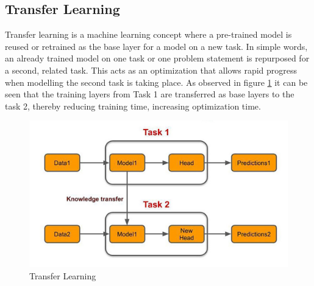 \subsection{Transfer Learning} \label{subsection:transfer_learning}
Transfer learning is a machine learning concept where a pre-trained model is reused or retrained as the base layer for a model on a new task. In simple words, an already trained model on one task or one problem statement is repurposed for a second, related task. This acts as an optimization that allows rapid progress when modelling the second task is taking place. As observed in figure \ref{fig:transfer_learning} it can be seen that the training layers from Task 1 are transferred as base layers to the task 2, thereby reducing training time, increasing optimization time.
\begin{figure}[H]
\includegraphics[scale=0.4]{Photos/transfer_learning.jpg}
\caption{Transfer Learning} \label{fig:transfer_learning}
\end{figure}

